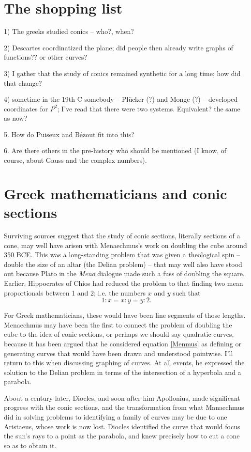 \documentclass[11pt]{book}
\begin{document}
\section{The shopping list}
1) The greeks studied conics -- who?, when?

2) Descartes coordinatized the plane; did people then already write graphs of functions?? or other curves?

3) I gather that the study of conics remained synthetic for a long time; how did that change?

4) sometime in the 19th C somebody -- Pl\"ucker (?) and Monge (?) -- developed coordinates
for $P^2$; I've read that there were two systems. Equivalent? the same as now?

5. How do Puiseux and B\'ezout fit into this?

6. Are there others in the pre-history who should be mentioned (I know, of course, about Gauss and the complex numbers).


\section{Greek mathematicians and conic sections}
Surviving sources suggest that the study of conic sections, literally sections of a cone, may well have arisen with Menaechmus's work on doubling the cube around 350 BCE. This was a long-standing problem that was given a theological spin -- double the size of an altar (the Delian problem) -- that may well also have stood out because Plato in the \emph{Meno} dialogue made such a fuss of doubling the square. Earlier, Hippocrates of Chios had reduced the problem to that finding two mean proportionals between 1 and 2; i.e. the numbers $x$ and $y$ such that 
\begin{equation}~\label{Menmus}
1:x= x:y = y: 2.
\end{equation}

For Greek mathematicians, these would have been line segments of those lengths. Menaechmus may have been the first to connect the problem of doubling the cube to the idea of conic sections, or perhaps we should say quadratic curves, because it has been argued that he considered equation \eqref{Menmus} as defining or generating curves that would have been drawn and understood pointwise. I'll return to this when discussing graphing of curves. At all events, he expressed the solution to the Delian problem in terms of the intersection of a hyperbola and a parabola. 

About a century later, Diocles, and soon after him Apollonius, made significant progress with the conic sections, and the transformation from what Manaechmus did in solving problems to identifying a family of curves may be due to one Aristaeus, whose work is now lost. Diocles identified the curve that would focus the sun's rays to a point as the parabola, and knew precisely how to cut a cone so as to obtain it. 
\end{document}
